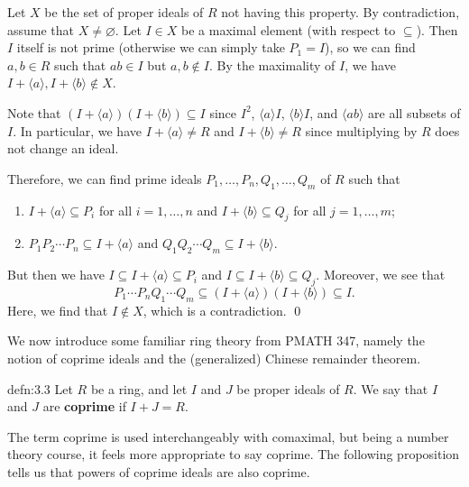 \begin{pf}
    Let $X$ be the set of proper ideals of $R$ not having this property. 
    By contradiction, assume that $X \neq \varnothing$. Let $I \in X$ be 
    a maximal element (with respect to $\subseteq$). Then $I$ itself 
    is not prime (otherwise we can simply take $P_1 = I$), so we can find 
    $a, b \in R$ such that $ab \in I$ but $a, b \notin I$. By 
    the maximality of $I$, we have $I + \langle a \rangle, I + \langle b 
    \rangle \notin X$. 

    Note that $(I + \langle a \rangle)(I + \langle b \rangle) 
    \subseteq I$ since $I^2$, $\langle a \rangle I$, $\langle b \rangle I$, 
    and $\langle ab \rangle$ are all subsets of $I$. In particular, we have 
    $I + \langle a \rangle \neq R$ and $I + \langle b \rangle \neq R$ since 
    multiplying by $R$ does not change an ideal. 

    Therefore, we can find prime ideals $P_1, \dots, P_n, Q_1, \dots, Q_m$ 
    of $R$ such that 
    \begin{enumerate}[(1)]
        \item $I + \langle a \rangle \subseteq P_i$ for all $i = 1, \dots, n$ 
        and $I + \langle b \rangle \subseteq Q_j$ for all $j = 1, \dots, m$;
        \item $P_1 P_2 \cdots P_n \subseteq I + \langle a \rangle$ 
        and $Q_1 Q_2 \cdots Q_m \subseteq I + \langle b \rangle$. 
    \end{enumerate}
    But then we have $I \subseteq I + \langle a \rangle \subseteq P_i$ 
    and $I \subseteq I + \langle b \rangle \subseteq Q_j$. Moreover, 
    we see that 
    \[ P_1 \cdots P_n Q_1 \cdots Q_m \subseteq (I + \langle a \rangle) 
    (I + \langle b \rangle) \subseteq I. \] 
    Here, we find that $I \notin X$, which is a contradiction. \qed 
\end{pf}\vspace{-0.25cm}

We now introduce some familiar ring theory from PMATH 347, namely the 
notion of coprime ideals and the (generalized) Chinese remainder theorem. 

\begin{defn}{defn:3.3}
    Let $R$ be a ring, and let $I$ and $J$ be proper ideals of $R$. We say 
    that $I$ and $J$ are {\bf coprime} if $I + J = R$.
\end{defn}\vspace{-0.25cm}

The term coprime is used interchangeably with comaximal, but being a 
number theory course, it feels more appropriate to say coprime.
The following proposition tells us that powers of coprime ideals are also 
coprime. 

